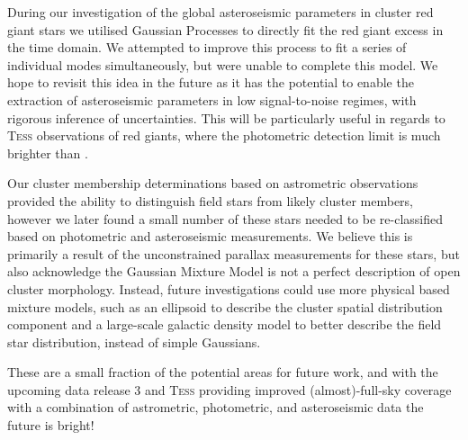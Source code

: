 During our investigation of the global asteroseismic parameters in cluster red giant stars we utilised Gaussian Processes to directly fit the red giant excess in the time domain. We attempted to improve this process to fit a series of individual modes simultaneously, but were unable to complete this model. We hope to revisit this idea in the future as it has the potential to enable the extraction of asteroseismic parameters in low signal-to-noise regimes, with rigorous inference of uncertainties. This will be particularly useful in regards to \textsc{Tess} observations of red giants, where the photometric detection limit is much brighter than \Kepler{}.

Our cluster membership determinations based on \Gaia{} astrometric observations provided the ability to distinguish field stars from likely cluster members, however we later found a small number of these stars needed to be re-classified based on photometric and asteroseismic measurements. We believe this is primarily a result of the unconstrained parallax measurements for these stars, but also acknowledge the Gaussian Mixture Model is not a perfect description of open cluster morphology. Instead, future investigations could use more physical based mixture models, such as an ellipsoid to describe the cluster spatial distribution component \citep{kuhn_mixture_2017} and a large-scale galactic density model to better describe the field star distribution, instead of simple Gaussians.

These are a small fraction of the potential areas for future work, and with the upcoming \Gaia{} data release 3 and \textsc{Tess} providing improved (almost)-full-sky coverage with a combination of astrometric, photometric, and asteroseismic data the future is bright! 
